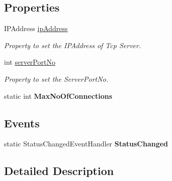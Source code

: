 \subsection*{Properties}
\begin{DoxyCompactItemize}
\item 
IPAddress \hyperlink{class_t_c_p_server_library_1_1_t_c_p_server_a467ff186f80228c8caf623ebbf295f96}{ipAddress}
\begin{DoxyCompactList}\small\item\em Property to set the IPAddress of Tcp Server. \item\end{DoxyCompactList}\item 
int \hyperlink{class_t_c_p_server_library_1_1_t_c_p_server_a505fbf9bb8faf9bcfb696a219c356a65}{serverPortNo}
\begin{DoxyCompactList}\small\item\em Property to set the ServerPortNo. \item\end{DoxyCompactList}\item 
\hypertarget{class_t_c_p_server_library_1_1_t_c_p_server_adec2a1a2be8224f79a7b8be44cdd3994}{
static int {\bfseries MaxNoOfConnections}}
\label{class_t_c_p_server_library_1_1_t_c_p_server_adec2a1a2be8224f79a7b8be44cdd3994}

\end{DoxyCompactItemize}
\subsection*{Events}
\begin{DoxyCompactItemize}
\item 
\hypertarget{class_t_c_p_server_library_1_1_t_c_p_server_af5f9ca4402c2a7a3dfce32efc0682ea9}{
static StatusChangedEventHandler {\bfseries StatusChanged}}
\label{class_t_c_p_server_library_1_1_t_c_p_server_af5f9ca4402c2a7a3dfce32efc0682ea9}

\end{DoxyCompactItemize}


\subsection{Detailed Description}


